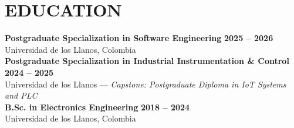 \documentclass[letterpaper,10pt]{article}
\begin{document}
\section{EDUCATION}
\textbf{Postgraduate Specialization in Software Engineering} \hfill \textbf{2025 -- 2026} \\
Universidad de los Llanos, Colombia \\
\textbf{Postgraduate Specialization in Industrial Instrumentation \& Control} \hfill \textbf{2024 -- 2025} \\
Universidad de los Llanos --- \textit{Capstone: Postgraduate Diploma in IoT Systems and PLC} \\
\textbf{B.Sc. in Electronics Engineering} \hfill \textbf{2018 -- 2024} \\
Universidad de los Llanos, Colombia
\end{document}
